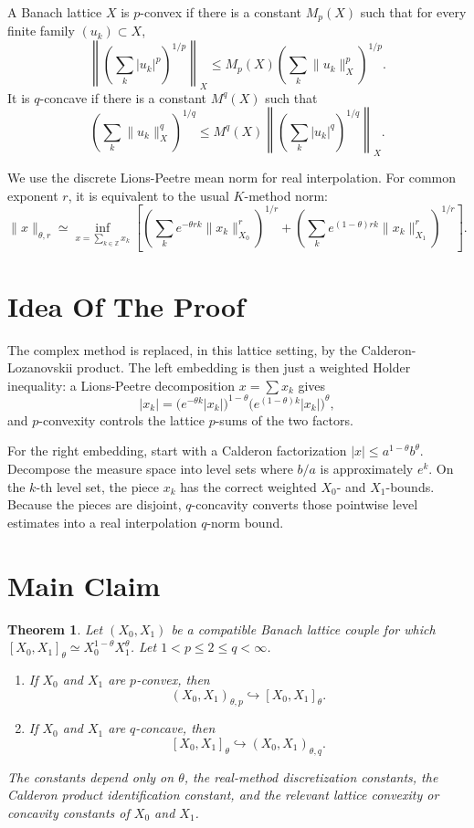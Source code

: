 \documentclass[11pt]{article}
\newtheorem{theorem}{Theorem}
\begin{document}
A Banach lattice \(X\) is \(p\)-convex if there is a constant \(M_p(X)\) such
that for every finite family \((u_k)\subset X\),
\[
\left\|\left(\sum_k |u_k|^p\right)^{1/p}\right\|_X
\leq M_p(X)\left(\sum_k \|u_k\|_X^p\right)^{1/p}.
\]
It is \(q\)-concave if there is a constant \(M^q(X)\) such that
\[
\left(\sum_k \|u_k\|_X^q\right)^{1/q}
\leq M^q(X)
\left\|\left(\sum_k |u_k|^q\right)^{1/q}\right\|_X.
\]

We use the discrete Lions-Peetre mean norm for real interpolation.  For
common exponent \(r\), it is equivalent to the usual \(K\)-method norm:
\[
\|x\|_{\theta,r}
\simeq \inf_{x=\sum_{k\in\mathbb Z}x_k}
\left[
\left(\sum_k e^{-\theta r k}\|x_k\|_{X_0}^r\right)^{1/r}
+
\left(\sum_k e^{(1-\theta)r k}\|x_k\|_{X_1}^r\right)^{1/r}
\right].
\]

\section*{Idea Of The Proof}

The complex method is replaced, in this lattice setting, by the
Calderon-Lozanovskii product.  The left embedding is then just a weighted
Holder inequality: a Lions-Peetre decomposition \(x=\sum x_k\) gives
\[
|x_k|=
\big(e^{-\theta k}|x_k|\big)^{1-\theta}
\big(e^{(1-\theta)k}|x_k|\big)^\theta,
\]
and \(p\)-convexity controls the lattice \(p\)-sums of the two factors.

For the right embedding, start with a Calderon factorization
\(|x|\leq a^{1-\theta}b^\theta\).  Decompose the measure space into level
sets where \(b/a\) is approximately \(e^k\).  On the \(k\)-th level set,
the piece \(x_k\) has the correct weighted \(X_0\)- and \(X_1\)-bounds.
Because the pieces are disjoint, \(q\)-concavity converts those pointwise
level estimates into a real interpolation \(q\)-norm bound.

\section*{Main Claim}

\begin{theorem}
Let \((X_0,X_1)\) be a compatible Banach lattice couple for which
\([X_0,X_1]_\theta\simeq X_0^{1-\theta}X_1^\theta\).  Let
\(1<p\leq 2\leq q<\infty\).

\begin{enumerate}
\item If \(X_0\) and \(X_1\) are \(p\)-convex, then
\[
(X_0,X_1)_{\theta,p}\hookrightarrow [X_0,X_1]_\theta.
\]
\item If \(X_0\) and \(X_1\) are \(q\)-concave, then
\[
[X_0,X_1]_\theta\hookrightarrow (X_0,X_1)_{\theta,q}.
\]
\end{enumerate}
The constants depend only on \(\theta\), the real-method discretization
constants, the Calderon product identification constant, and the relevant
lattice convexity or concavity constants of \(X_0\) and \(X_1\).
\end{theorem}
\end{document}
